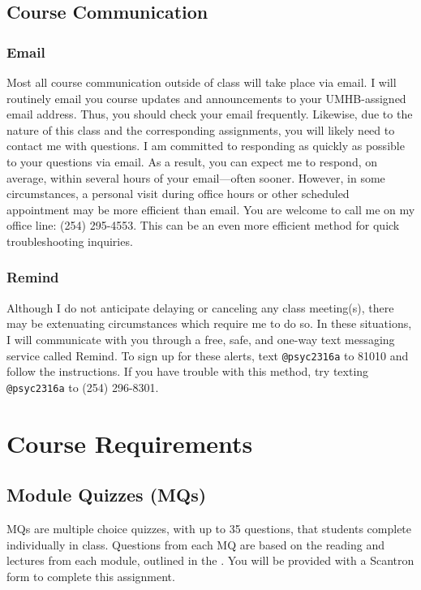 \documentclass[article]{article}
\begin{document}
\subsection{Course Communication}
\subsubsection{Email}
Most all course communication outside of class will take place via email.  I will routinely email you course updates and announcements to your UMHB-assigned email address.  Thus, you should check your email frequently.  Likewise, due to the nature of this class and the corresponding assignments, you will likely need to contact me with questions. I am committed to responding as quickly as possible to your questions via email. As a result, you can expect me to respond, on average, within several hours of your email---often sooner. However, in some circumstances, a personal visit during office hours or other scheduled appointment may be more efficient than email. You are welcome to call me on my office line: (254) 295-4553. This can be an even more efficient method for quick troubleshooting inquiries.

\subsubsection{Remind}
Although I do not anticipate delaying or canceling any class meeting(s), there may be extenuating circumstances which require me to do so.  In these situations, I will communicate with you through a free, safe, and one-way text messaging service called Remind.  To sign up for these alerts, text {\texttt{@psyc2316a}} to 81010 and follow the instructions.  If you have trouble with this method, try texting {\texttt{@psyc2316a}} to (254) 296-8301.

\section{Course Requirements}

\subsection{Module Quizzes (MQs)}
MQs are multiple choice quizzes, with up to 35 questions, that students complete individually in class.  Questions from each MQ are based on the reading and lectures from each module, outlined in the .  You will be provided with a Scantron form to complete this assignment.
\end{document}
